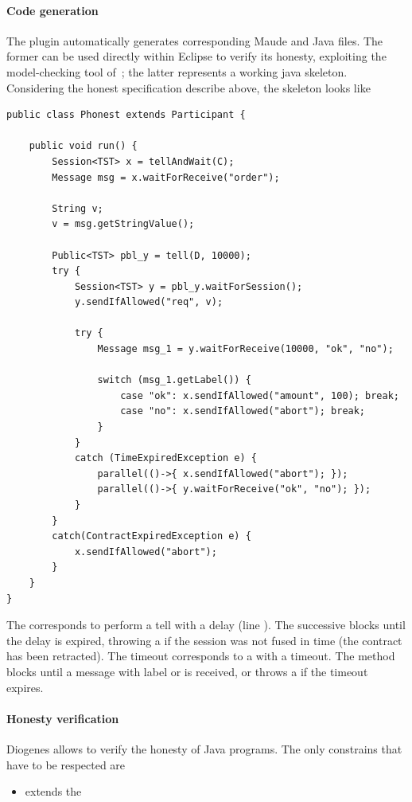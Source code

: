 \paragraph{Code generation}
The plugin automatically generates corresponding Maude and Java files.
The former can be used directly within Eclipse to verify its honesty,
exploiting the model-checking tool of~\cite{verifiable};
the latter represents a working java skeleton. 
Considering the honest specification describe above, the skeleton looks like
\begin{mdframed}
\begin{verbatim}
public class Phonest extends Participant {
            
    public void run() {
        Session<TST> x = tellAndWait(C);    
        Message msg = x.waitForReceive("order");
        
        String v;
        v = msg.getStringValue();
        
        Public<TST> pbl_y = tell(D, 10000);
        try {
            Session<TST> y = pbl_y.waitForSession();
            y.sendIfAllowed("req", v);
            
            try {
                Message msg_1 = y.waitForReceive(10000, "ok", "no");
                
                switch (msg_1.getLabel()) {                    
                    case "ok": x.sendIfAllowed("amount", 100); break;
                    case "no": x.sendIfAllowed("abort"); break;                    
                }
            }
            catch (TimeExpiredException e) {
                parallel(()->{ x.sendIfAllowed("abort"); });
                parallel(()->{ y.waitForReceive("ok", "no"); });
            }            
        }
        catch(ContractExpiredException e) {
            x.sendIfAllowed("abort");
        }
    }
}
\end{verbatim}
\end{mdframed}

The  corresponds to perform a tell with
a delay (line ). The successive  blocks until the delay is
expired, throwing a  if the session 
was not fused in time (the contract has been retracted).
The timeout  corresponds to a  with a timeout.
The method blocks until a message with label  or  is received,
or throws a  if the timeout expires.


\paragraph{Honesty verification}
Diogenes allows to verify the honesty of Java programs. 
The only constrains that have to be respected are
\begin{itemize}
\item extends the 
\end{itemize}

